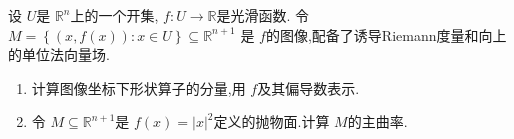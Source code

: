 \documentclass[../../几何与拓扑.tex]{subfiles}
\begin{document}
    
\ifSubfilesClassLoaded{
    \frontmatter

    \tableofcontents
    
    \mainmatter
}{}

\begin{problemsec}

\end{problemsec}

\begin{problem}
    设 \(  U  \)是 \(  \mathbb{R} ^{n}  \)上的一个开集, \(  f:U\to \mathbb{R}   \)是光滑函数.
    令 \(  M =  \left\{ \left( x,f\left( x \right)  \right): x \in U  \right\}  \subseteq \mathbb{R} ^{n+ 1}\)    是 \(  f  \)的图像,配备了诱导Riemann度量和向上的单位法向量场.
    \begin{enumerate}
        \item 计算图像坐标下形状算子的分量,用 \(  f  \)及其偏导数表示.
        \item 令 \(  M\subseteq \mathbb{R} ^{n+ 1}  \)是 \(  f\left( x \right)= \left| x \right|^{2}    \)定义的抛物面.计算 \(  M  \)的主曲率.    
    \end{enumerate}
     
\end{problem}
\end{document}
